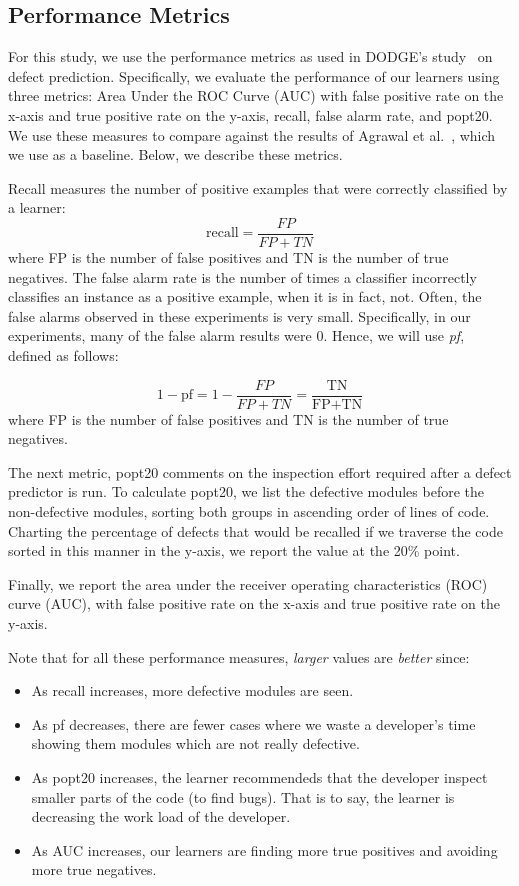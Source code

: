 \documentclass[10pt,compsoc,twocolumn]{IEEEtran}
\begin{document}
\subsection{Performance Metrics}\label{sec:perfs}
For this study, we use the performance metrics as    used in DODGE's study~\cite{agrawal2019dodge} on defect prediction.
Specifically, we evaluate the performance of our learners using three metrics: Area Under the ROC Curve (AUC) with false positive rate on the x-axis and true positive rate on the y-axis, recall, false alarm rate, and popt20. We use these measures to compare against the results of Agrawal et al.~\cite{agrawal2019dodge}, which we use as a baseline. Below, we describe these metrics.

Recall measures the number of positive examples that were correctly classified by a learner:
\[
    \text{recall} = \frac{\mathit{FP}}{\mathit{FP}+\mathit{TN}}
\]
where FP is the number of false positives and TN is the number of true negatives.
The false alarm rate is the number of times a classifier incorrectly classifies an instance as a positive example, when it is in fact, not. Often, the false alarms observed in these experiments is very
small. Specifically, in our experiments, many of the false alarm results were 0. Hence, we will use {\em pf}, defined as follows:

\[
    1-\text{pf} = 1-\frac{\mathit{FP}}{\mathit{FP}+\mathit{TN}} = \frac{\text{TN}}{\text{FP}+\text{TN}}
\]
where FP is the number of false positives and TN is the number of true negatives. 

The next metric, popt20 comments on the inspection effort required after a defect predictor is run. To calculate popt20, we list the defective modules before the non-defective modules, sorting both groups in ascending order of lines of code. Charting the percentage of defects that would be recalled if we traverse the code sorted in this manner in the y-axis, we report the value at the 20\% point. 


Finally, we report the area under the receiver operating characteristics (ROC) curve (AUC), with false positive rate on the x-axis and true positive rate on the y-axis.

Note
that for all these performance measures, {\em larger} values are {\em better} since:
\begin{itemize}
\item
As  recall increases,
  more defective modules are seen.   
 \item
 As   pf decreases,
there are fewer cases where we waste a developer's time showing them modules which are not really defective. 
 \item
 As  popt20 increases, the  learner recommendeds that the developer inspect  smaller parts of the code (to find bugs).
 That is to say, the learner is decreasing the work load of the developer.   
  \item
  As  AUC increases, our learners  are finding more true positives and avoiding more true negatives.

\end{itemize}
\end{document}
